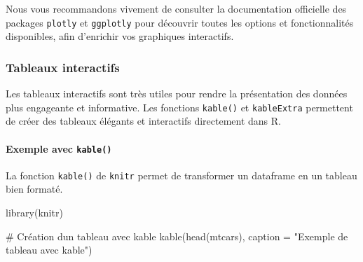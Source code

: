 \documentclass[
  letterpaper,
  DIV=11,
  numbers=noendperiod]{scrreprt}
\let\oldparagraph\paragraph
\renewcommand{\paragraph}[1]{\oldparagraph{#1}\mbox{}}
\newenvironment{Shaded}{\begin{snugshade}}{\end{snugshade}}
\newcommand{\AttributeTok}[1]{\textcolor[rgb]{0.40,0.45,0.13}{#1}}
\newcommand{\CommentTok}[1]{\textcolor[rgb]{0.37,0.37,0.37}{#1}}
\newcommand{\FunctionTok}[1]{\textcolor[rgb]{0.28,0.35,0.67}{#1}}
\newcommand{\NormalTok}[1]{\textcolor[rgb]{0.00,0.23,0.31}{#1}}
\newcommand{\StringTok}[1]{\textcolor[rgb]{0.13,0.47,0.30}{#1}}
\begin{document}
Nous vous recommandons vivement de consulter la documentation officielle
des packages \texttt{plotly} et \texttt{ggplotly} pour découvrir toutes
les options et fonctionnalités disponibles, afin d'enrichir vos
graphiques interactifs.

\hypertarget{tableaux-interactifs}{%
\subsubsection{Tableaux interactifs}\label{tableaux-interactifs}}

Les tableaux interactifs sont très utiles pour rendre la présentation
des données plus engageante et informative. Les fonctions
\texttt{kable()} et \texttt{kableExtra} permettent de créer des tableaux
élégants et interactifs directement dans R.

\hypertarget{exemple-avec-kable}{%
\paragraph{\texorpdfstring{Exemple avec
\texttt{kable()}}{Exemple avec kable()}}\label{exemple-avec-kable}}

La fonction \texttt{kable()} de \texttt{knitr} permet de transformer un
dataframe en un tableau bien formaté.

\begin{Shaded}
\begin{Highlighting}[]
\FunctionTok{library}\NormalTok{(knitr)}

\CommentTok{\# Création d\textquotesingle{}un tableau avec kable}
\FunctionTok{kable}\NormalTok{(}\FunctionTok{head}\NormalTok{(mtcars), }\AttributeTok{caption =} \StringTok{"Exemple de tableau avec kable"}\NormalTok{)}
\end{Highlighting}
\end{Shaded}
\end{document}
